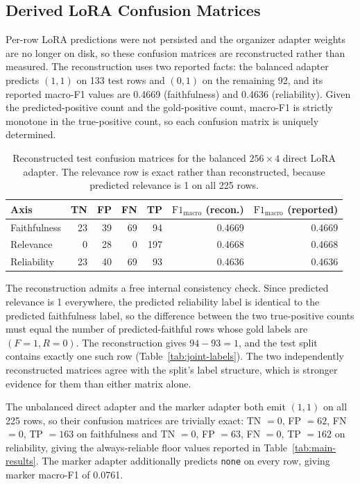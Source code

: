 \documentclass{zapiski}
\newcommand{\fmacro}{\mathrm{F1}_{\mathrm{macro}}}
\begin{document}
\subsection{Derived LoRA Confusion Matrices}
\label{sec:appendix-lora}

Per-row LoRA predictions were not persisted and the organizer adapter weights
are no longer on disk, so these confusion matrices are reconstructed rather
than measured. The reconstruction uses two reported facts: the balanced
adapter predicts $(1,1)$ on 133 test rows and $(0,1)$ on the remaining 92, and
its reported macro-F1 values are 0.4669 (faithfulness) and 0.4636
(reliability). Given the predicted-positive count and the gold-positive count,
macro-F1 is strictly monotone in the true-positive count, so each confusion
matrix is uniquely determined.

\begin{table}[H]
\centering
\caption{Reconstructed test confusion matrices for the balanced
$256{\times}4$ direct LoRA adapter. The relevance row is exact rather than
reconstructed, because predicted relevance is 1 on all 225 rows.}
\label{tab:lora-reconstruction}
\footnotesize
\begin{tabular}{lrrrrrr}
\toprule
Axis & TN & FP & FN & TP & $\fmacro$ (recon.) & $\fmacro$ (reported) \\
\midrule
Faithfulness & 23 & 39 & 69 &  94 & 0.4669 & 0.4669 \\
Relevance    &  0 & 28 &  0 & 197 & 0.4668 & 0.4668 \\
Reliability  & 23 & 40 & 69 &  93 & 0.4636 & 0.4636 \\
\bottomrule
\end{tabular}
\end{table}

The reconstruction admits a free internal consistency check. Since predicted
relevance is 1 everywhere, the predicted reliability label is identical to the
predicted faithfulness label, so the difference between the two true-positive
counts must equal the number of predicted-faithful rows whose gold labels are
$(F{=}1, R{=}0)$. The reconstruction gives $94 - 93 = 1$, and the test split
contains exactly one such row (Table~\ref{tab:joint-labels}). The two
independently reconstructed matrices agree with the split's label structure,
which is stronger evidence for them than either matrix alone.

The unbalanced direct adapter and the marker adapter both emit $(1,1)$ on all
225 rows, so their confusion matrices are trivially exact: TN $=0$, FP $=62$,
FN $=0$, TP $=163$ on faithfulness and TN $=0$, FP $=63$, FN $=0$, TP $=162$
on reliability, giving the always-reliable floor values reported in
Table~\ref{tab:main-results}. The marker adapter additionally predicts
\texttt{none} on every row, giving marker macro-F1 of 0.0761.
\end{document}
